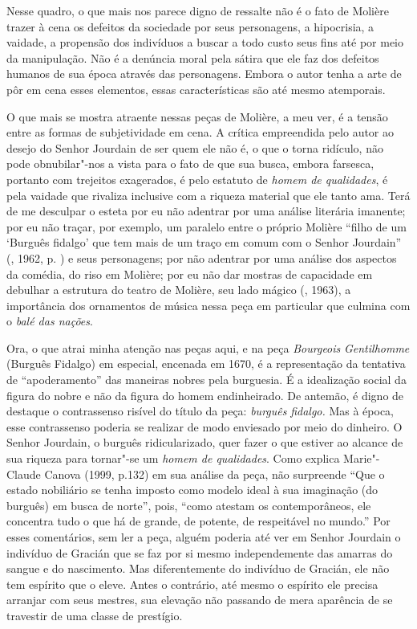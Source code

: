 Nesse quadro, o que mais nos parece digno de ressalte não é o fato de
Molière trazer à cena os defeitos da sociedade por seus personagens, a
hipocrisia, a vaidade, a propensão dos indivíduos a buscar a todo custo
seus fins até por meio da manipulação. Não é a denúncia moral pela
sátira que ele faz dos defeitos humanos de sua época através das
personagens. Embora o autor tenha a arte de pôr em cena esses elementos,
essas características são até mesmo atemporais.

O que mais se mostra atraente nessas peças de Molière, a meu ver, é a tensão entre as
formas de subjetividade em cena. A crítica empreendida pelo autor ao
desejo do Senhor Jourdain de ser quem ele não é, o que o torna ridículo,
não pode obnubilar"-nos a vista para o fato de que sua busca, embora farsesca,
portanto com trejeitos exagerados, é pelo estatuto de \emph{homem de
qualidades}, é pela vaidade que rivaliza inclusive com a riqueza
material que ele tanto ama. Terá de me desculpar o esteta por eu
não adentrar por uma análise literária imanente; por eu não traçar, por
exemplo, um paralelo entre o próprio Molière ``filho de um `Burguês
fidalgo' que tem mais de um traço em comum com o Senhor Jourdain'' (,
1962, p. ) e seus personagens; por não adentrar por uma análise dos
aspectos da comédia, do riso em Molière; por eu não dar
mostras de capacidade em debulhar a estrutura
do teatro de Molière, seu lado mágico (, 1963), a importância
dos ornamentos de música nessa peça em particular que culmina com o
\emph{balé das nações}.

Ora, o que atrai minha atenção nas peças aqui, e na peça
\emph{Bourgeois} \emph{Gentilhomme} (Burguês Fidalgo) em especial,
encenada em 1670, é a representação da tentativa de ``apoderamento'' das
maneiras nobres pela burguesia. É a idealização social da figura do
nobre e não da figura do homem endinheirado. De antemão, é digno de
destaque o contrassenso risível do título da peça: \emph{burguês}
\emph{fidalgo.} Mas à época, esse contrassenso poderia se realizar de
modo enviesado por meio do dinheiro. O Senhor Jourdain, o burguês
ridicularizado, quer fazer o que estiver ao alcance de sua riqueza para
tornar"-se um \emph{homem de qualidades}. Como explica Marie"-Claude
Canova (1999, p.132) em sua análise da peça, não surpreende ``Que o
estado nobiliário se tenha imposto como modelo ideal à sua imaginação
(do burguês) em busca de norte'', pois, ``como atestam os
contemporâneos, ele concentra tudo o que há de grande, de potente, de
respeitável no mundo.'' Por esses comentários, sem ler a peça, alguém
poderia até ver em Senhor Jourdain o indivíduo de Gracián que se faz por
si mesmo independemente das amarras do sangue e do nascimento. Mas diferentemente do
indivíduo de Gracián, ele não tem espírito que o eleve. Antes o
contrário, até mesmo o espírito ele precisa arranjar com seus mestres,
sua elevação não passando de mera aparência de se travestir de uma
classe de prestígio.


